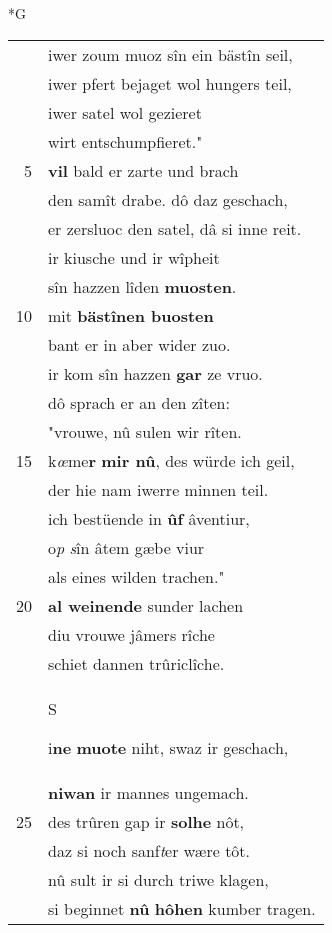 \documentclass[8pt,a4paper,notitlepage]{article}
\begin{document}
\begin{table}[ht]
\begin{minipage}[t]{0.5\linewidth}
\small
\begin{center}*G
\end{center}
\begin{tabular}{rl}
 & iwer zoum muoz sîn ein bästîn seil,\\ 
 & iwer pfert bejaget wol hungers teil,\\ 
 & iwer satel wol gezieret\\ 
 & wirt entschumpfieret."\\ 
5 & \textbf{vil} bald er zarte und brach\\ 
 & den samît drabe. dô daz geschach,\\ 
 & er zersluoc den satel, dâ si inne reit.\\ 
 & ir kiusche und ir wîpheit\\ 
 & sîn hazzen lîden \textbf{muosten}.\\ 
10 & mit \textbf{bästînen buosten}\\ 
 & bant er in aber wider zuo.\\ 
 & ir kom sîn hazzen \textbf{gar} ze vruo.\\ 
 & dô sprach er an den zîten:\\ 
 & "vrouwe, nû sulen wir rîten.\\ 
15 & k\textit{œ}me\textbf{r} \textbf{mir nû}, des würde ich geil,\\ 
 & der hie nam iwerre minnen teil.\\ 
 & ich bestüende in \textbf{ûf} âventiur,\\ 
 & o\textit{p} \textit{s}în âtem gæbe viur\\ 
 & als eines wilden trachen."\\ 
20 & \textbf{al weinende} sunder lachen\\ 
 & diu vrouwe jâmers rîche\\ 
 & schiet dannen trûriclîche.\\ 
 & \begin{large}S\end{large}i\textbf{ne} \textbf{muote} niht, swaz ir geschach,\\ 
 & \textbf{niwan} ir mannes ungemach.\\ 
25 & des trûren gap ir \textbf{solhe} nôt,\\ 
 & daz si noch sanf\textit{t}er wære tôt.\\ 
 & nû sult ir si durch triwe klagen,\\ 
 & si beginnet \textbf{nû} \textbf{hôhen} kumber tragen.\\ 

\end{tabular}
\end{minipage}
\end{table}
\end{document}
